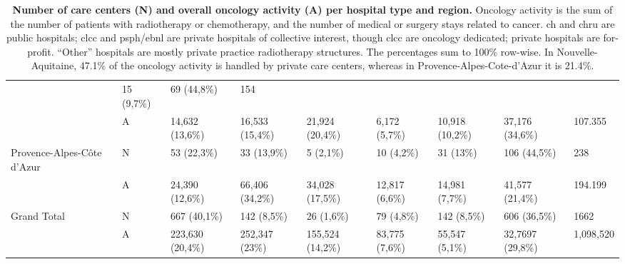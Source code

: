 \begin{table}[h!]
{\begin{tabular}{|l|l|l|l|l|l|l|l|l|}
                                                              & 15 (9,7\%)      & 69 (44,8\%)                                 & 154                                                                      \\
            ~                                                 & A               & 14,632 (13,6\%)                             & 16,533 (15,4\%) & 21,924 (20,4\%)  & 6,172
            (5,7\%)                                           & 10,918 (10,2\%) & 37,176 (34,6\%)                             & 107.355                                                                  \\ \hline
            Provence-Alpes-Côte d'Azur                        & N               & 53 (22,3\%)                                 & 33 (13,9\%)     & 5 (2,1\%)        &
            10 (4,2\%)                                        & 31 (13\%)       & 106 (44,5\%)                                & 238                                                                      \\
            ~                                                 & A               & 24,390 (12,6\%)                             & 66,406 (34,2\%) & 34,028 (17,5\%)  & 12,817
            (6,6\%)                                           & 14,981 (7,7\%)  & 41,577 (21,4\%)                             & 194.199                                                                  \\ \hline
            Grand Total                                       & N               & 667 (40,1\%)                                & 142 (8,5\%)     & 26 (1,6\%)       & 79 (4,8\%)     &
            142 (8,5\%)                                       & 606 (36,5\%)    & 1662                                                                                                                   \\
            ~                                                 & A               & 223,630 (20,4\%)                            & 252,347 (23\%)  & 155,524 (14,2\%) & 83,775
            (7,6\%)                                           & 55,547 (5,1\%)  & 32,7697 (29,8\%)                            & 1,098,520                                                                \\ \hline
        \end{tabular}} \caption{ \textbf{Number of care centers (N) and overall
            oncology activity (A) per hospital type and region.} Oncology activity is
        the sum of the number of patients with radiotherapy or chemotherapy, and the
        number of medical or surgery stays related to cancer. \ac{ch} and \ac{chru}
        are public hospitals; \ac{clcc} and \ac{psph}/\ac{ebnl} are private
        hospitals of collective interest, though \acs{clcc} are oncology dedicated;
        private hospitals are for-profit. “Other” hospitals are mostly private
        practice radiotherapy structures. The percentages sum to 100\% row-wise. In
        Nouvelle-Aquitaine, 47.1\% of the oncology activity is handled by private
        care centers, whereas in Provence-Alpes-Cote-d'Azur it is 21.4\%. }
    \label{table:oncology-activity-per-region}
\end{table}

